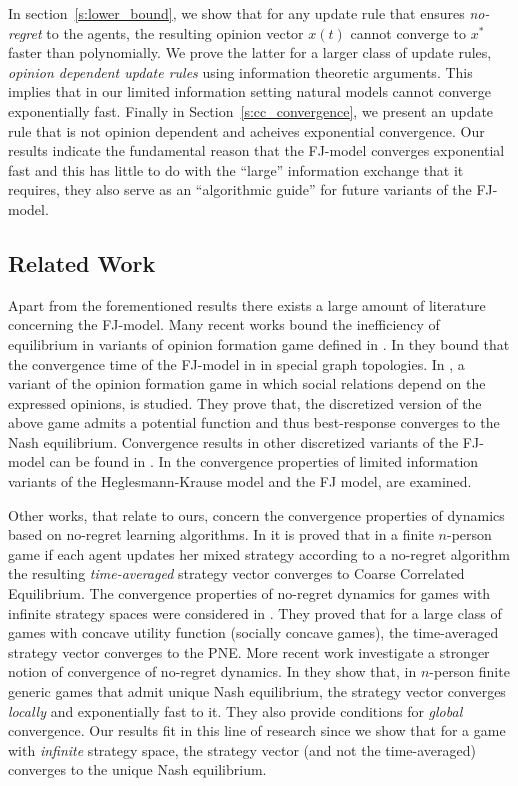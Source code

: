 In section~\ref{s:lower_bound}, we show 
that for any update rule that ensures \emph{no-regret}
to the agents, the resulting opinion vector $x(t)$
cannot converge to $x^*$ faster than polynomially. We
prove the latter for a larger class of update rules,
\emph{opinion dependent update rules} using information
theoretic arguments. This implies that in our limited 
information setting natural models cannot converge exponentially
fast. Finally in Section~\ref{s:cc_convergence}, we present 
an update rule that is not opinion dependent and acheives exponential
convergence. Our results indicate the fundamental reason that
the FJ-model converges exponential fast and this has little 
to do with the \enquote{large} information exchange that it requires,
they also serve as an \enquote{algorithmic guide} for future 
variants of the FJ-model. 

\subsection{Related Work}
Apart from the forementioned results there exists a large amount 
of literature concerning the FJ-model.
Many recent works \cite{BGM13,CKO13,BFM16,EFHS17} bound the 
inefficiency of equilibrium in variants of opinion formation game 
defined in \cite{BKO11}. In \cite{GS14} they bound that the convergence 
time of the FJ-model in in special graph topologies.
In \cite{BFM16}, a variant of the opinion formation game in which social
relations depend on the expressed opinions, is studied.
They prove that, the discretized version of the above game admits
a potential function and thus best-response converges to the
Nash equilibrium. Convergence results in other discretized variants of
the FJ-model can be found in \cite{YOASS13,FGV16}. In \cite{FPS16} the convergence
properties of limited information variants of the Heglesmann-Krause model \cite{HK} 
and the FJ model, are examined.


Other works, that relate to ours, concern the convergence
properties of dynamics based on no-regret learning algorithms.
In \cite{FV97,FS99,SA00,SALS15} it is proved that in a finite $n$-person
game if each agent updates her mixed strategy according to a no-regret
algorithm the resulting \emph{time-averaged} strategy vector converges to
Coarse Correlated Equilibrium. The convergence properties of no-regret dynamics 
for games with infinite strategy spaces were considered in \cite{EMN09}.
They proved that for a large class of games with concave utility function
(socially concave games), the time-averaged strategy vector converges to
the PNE. More recent work investigate a stronger notion of convergence of
no-regret dynamics. In \cite{CHM17} they show that,
in $n$-person finite generic games that admit unique Nash equilibrium,
the strategy vector converges \emph{locally} and exponentially fast
to it. They also provide conditions for \emph{global} convergence.
Our results fit in this line of research since we show that
for a game with \emph{infinite} strategy space, the strategy vector
(and not the time-averaged) converges to the unique Nash equilibrium.

